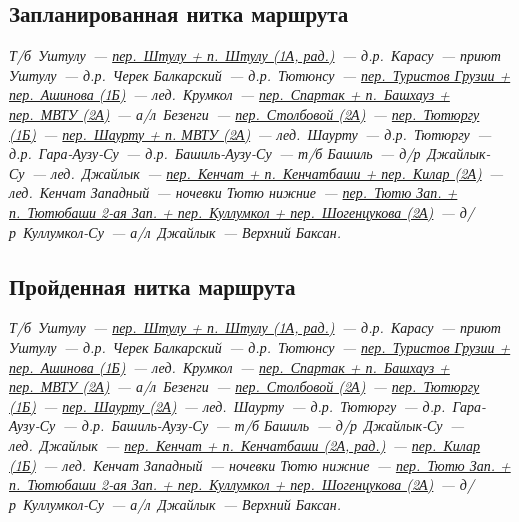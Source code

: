	\subsection{Запланированная нитка маршрута}\label{subsec:planned_route}
		\renewcommand{\bfdefault}{bx}
		\textit{
			Т/б~Уштулу~---
			\hyperref[subsec:main_obstacles]{пер.~Штулу + п.~Штулу (1А, рад.)}~---
			д.р.~Карасу~---
			приют Уштулу~---
			д.р.~Черек Балкарский~---
			д.р.~Тютюнсу~---
			\hyperref[subsec:main_obstacles]{пер.~Туристов Грузии + пер.~Ашинова (1Б)}~---
			лед.~Крумкол~---
			\hyperref[subsec:main_obstacles]{пер.~Спартак + п.~Башхауз + пер.~МВТУ (2А)}~---
			а/л~Безенги~---
			\hyperref[subsec:main_obstacles]{пер.~Столбовой (2А)}~---
			\hyperref[subsec:main_obstacles]{пер.~Тютюргу (1Б)}~---
			\hyperref[subsec:main_obstacles]{пер.~Шаурту + п. МВТУ (2А)}~---
			лед.~Шаурту~---
			д.р.~Тютюргу~---
			д.р.~Гара-Аузу-Су~---
			д.р.~Башиль-Аузу-Су~---
			т/б Башиль~---
			д/р~Джайлык-Су~---
			лед.~Джайлык~---
			\hyperref[subsec:main_obstacles]{пер.~Кенчат + п.~Кенчатбаши + пер.~Килар (2А)}~---
			лед.~Кенчат Западный~---
			ночевки Тютю нижние~---
			\hyperref[subsec:main_obstacles]{пер.~Тютю Зап. + п.~Тютюбаши 2-ая Зап. + пер.~Куллумкол + пер.~Шогенцукова (2А)}~---
			д/р~Куллумкол-Су~---
			а/л~Джайлык~---
			Верхний Баксан.
			}
	
	\subsection{Пройденная нитка маршрута}\label{subsec:real_route}
		\textit{
			Т/б~Уштулу~---
			\hyperref[subsec:main_obstacles]{пер.~Штулу + п.~Штулу (1А, рад.)}~---
			д.р.~Карасу~---
			приют Уштулу~---
			д.р.~Черек Балкарский~---
			д.р.~Тютюнсу~---
			\hyperref[subsec:main_obstacles]{пер.~Туристов Грузии + пер.~Ашинова (1Б)}~---
			лед.~Крумкол~---
			\hyperref[subsec:main_obstacles]{пер.~Спартак + п.~Башхауз + пер.~МВТУ (2А)}~---
			а/л~Безенги~---
			\hyperref[subsec:main_obstacles]{пер.~Столбовой (2А)}~---
			\hyperref[subsec:main_obstacles]{пер.~Тютюргу (1Б)}~---
			\hyperref[subsec:main_obstacles]{пер.~Шаурту (2А)}~---
			лед.~Шаурту~---
			д.р.~Тютюргу~---
			д.р.~Гара-Аузу-Су~---
			д.р.~Башиль-Аузу-Су~---
			т/б Башиль~---
			д/р~Джайлык-Су~---
			лед.~Джайлык~---
			\hyperref[subsec:main_obstacles]{пер.~Кенчат + п.~Кенчатбаши (2А, рад.)}~---
			\hyperref[subsec:main_obstacles]{пер.~Килар (1Б)}~---
			лед.~Кенчат Западный~---
			ночевки Тютю нижние~---
			\hyperref[subsec:main_obstacles]{пер.~Тютю Зап. + п.~Тютюбаши 2-ая Зап. + пер.~Куллумкол + пер.~Шогенцукова (2А)}~---
			д/р~Куллумкол-Су~---
			а/л~Джайлык~---
			Верхний Баксан.
			}
		\renewcommand{\bfdefault}{b}

